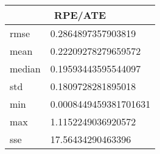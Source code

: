 \begin{table}[!ht] 
 \centering 
 \begin{tabular}{|l|l|} \hline 
 \multicolumn{2}{|c|}{RPE/ATE} \\ \hline 
 rmse & 0.2864897357903819 \\ \hline 
mean & 0.22209278279659572 \\ \hline 
median & 0.19593443595544097 \\ \hline 
std & 0.1809728281895018 \\ \hline 
min & 0.0008449459381701631 \\ \hline 
max & 1.1152249036920572 \\ \hline 
sse & 17.56434290463396 \\ \hline 
\end{tabular} 
 \end{table}